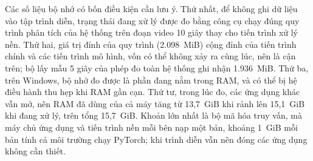 Các số liệu bộ nhớ có bốn điều kiện cần lưu ý. Thứ nhất, để không ghi dữ liệu vào tập trình diễn, trạng thái đang xử lý được đo bằng công cụ chạy đúng quy trình phân tích của hệ thống trên đoạn video 10 giây thay cho tiến trình xử lý nền. Thứ hai, giá trị đỉnh của quy trình (2.098~MiB) cộng đỉnh của tiến trình chính và các tiến trình mô hình, vốn có thể không xảy ra cùng lúc, nên là cận trên; bộ lấy mẫu 5 giây của phép đo toàn hệ thống ghi nhận 1.936~MiB. Thứ ba, trên Windows, bộ nhớ đo được là phần đang nằm trong RAM, và có thể bị hệ điều hành thu hẹp khi RAM gần cạn. Thứ tư, trong lúc đo, các ứng dụng khác vẫn mở, nên RAM đã dùng của cả máy tăng từ 13,7~GiB khi rảnh lên 15,1~GiB khi đang xử lý, trên tổng 15,7~GiB. Khoản lớn nhất là bộ mã hóa truy vấn, mà máy chủ ứng dụng và tiến trình nền mỗi bên nạp một bản, khoảng 1~GiB mỗi bản tính cả môi trường chạy PyTorch; khi trình diễn vẫn nên đóng các ứng dụng không cần thiết.
